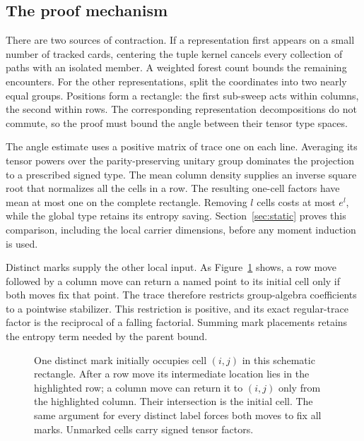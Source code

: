 \subsection*{The proof mechanism}
There are two sources of contraction. If a representation first appears
on a small number of tracked cards, centering the tuple kernel cancels
every collection of paths with an isolated member. A weighted forest
count bounds the remaining encounters. For the other representations,
split the coordinates into two nearly equal groups. Positions form a
rectangle: the first sub-sweep acts within columns, the second within
rows. The corresponding representation decompositions do not commute,
so the proof must bound the angle between their tensor type spaces.

The angle estimate uses a positive matrix of trace one on each line.
Averaging its tensor powers over the parity-preserving unitary group
dominates the projection to a prescribed signed type. The mean column
density supplies an inverse square root that normalizes all the cells
in a row. The resulting one-cell factors have mean at most one on the
complete rectangle. Removing $l$ cells costs at most $e^l$, while the
global type retains its entropy saving. Section~\ref{sec:static} proves
this comparison, including the local carrier dimensions, before any
moment induction is used.

Distinct marks supply the other local input. As Figure~\ref{fig:marked-grid}
shows, a row move followed by a column move can return a named point
to its initial cell only if both moves fix that point. The trace therefore restricts group-algebra
coefficients to a pointwise stabilizer. This restriction is positive,
and its exact regular-trace factor is the reciprocal of a falling
factorial. Summing mark placements retains the entropy term needed by
the parent bound.

\begin{figure}[t]
\centering

\caption{One distinct mark initially occupies cell $(i,j)$ in this
schematic rectangle. After a row move its intermediate location lies
in the highlighted row; a column move can return it to $(i,j)$ only
from the highlighted column. Their intersection is the initial cell.
The same argument for every distinct label forces both moves to fix
all marks. Unmarked cells carry signed tensor factors.}
\label{fig:marked-grid}
\end{figure}

